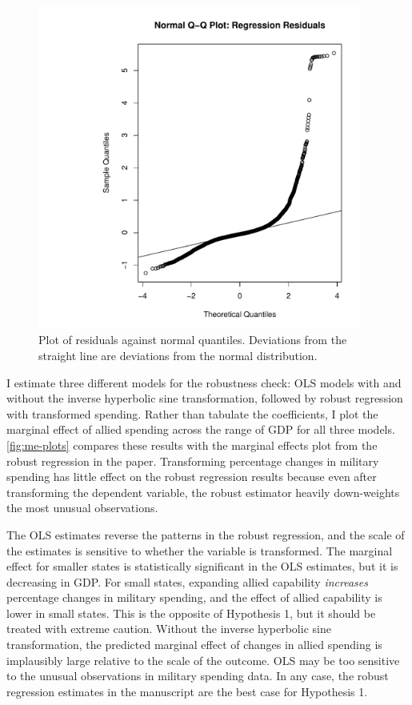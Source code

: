 \documentclass[12pt]{article}
\begin{document}
\begin{figure}[htbp]
	\centering
		\includegraphics[width=0.95\textwidth]{res-qq-plot.pdf}
	\caption{Plot of residuals against normal quantiles. Deviations from the straight line are deviations from the normal distribution.}
	\label{fig:res-qq-plot}
\end{figure}

I estimate three different models for the robustness check: OLS models with and without the inverse hyperbolic sine transformation, followed by robust regression with transformed spending. 
Rather than tabulate the coefficients, I plot the marginal effect of allied spending across the range of GDP for all three models.
\autoref{fig:me-plots} compares these results with the marginal effects plot from the robust regression in the paper. 
Transforming percentage changes in military spending has little effect on the robust regression results because even after transforming the dependent variable, the robust estimator heavily down-weights the most unusual observations. 


The OLS estimates reverse the patterns in the robust regression, and the scale of the estimates is sensitive to whether the variable is transformed. 
The marginal effect for smaller states is statistically significant in the OLS estimates, but it is decreasing in GDP. 
For small states, expanding allied capability \emph{increases} percentage changes in military spending, and the effect of allied capability is lower in small states. 
This is the opposite of Hypothesis 1, but it should be treated with extreme caution. 
Without the inverse hyperbolic sine transformation, the predicted marginal effect of changes in allied spending is implausibly large relative to the scale of the outcome. 
OLS may be too sensitive to the unusual observations in military spending data. 
In any case, the robust regression estimates in the manuscript are the best case for Hypothesis 1. 
\end{document}
